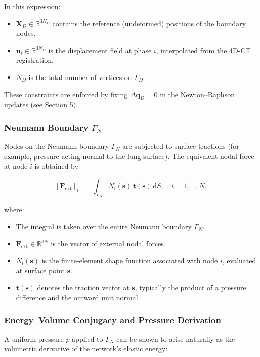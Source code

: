 \documentclass{article}
\begin{document}
In this expression:
\begin{itemize}
  \item $\mathbf X_D\in\mathbb R^{3N_D}$ contains the reference (undeformed) positions of the boundary nodes.
  \item $\mathbf u_i\in\mathbb R^{3N_D}$ is the displacement field at phase $i$, interpolated from the 4D-CT registration.
  \item $N_D$ is the total number of vertices on $\Gamma_D$.
\end{itemize}

These constraints are enforced by fixing $\Delta\mathbf q_D=0$ in the Newton–Raphson updates (see Section 5).

\subsubsection{Neumann Boundary $\Gamma_N$}

Nodes on the Neumann boundary $\Gamma_N$ are subjected to surface tractions (for example, pressure acting normal to the lung surface). 
The equivalent nodal force at node $i$ is obtained by

$$
  [\mathbf F_{\mathrm{ext}}]_i
  \;=\;
  \int_{\Gamma_N} N_i(\mathbf s)\,\mathbf t(\mathbf s)\,\mathrm dS,
  \quad i=1,\dots,N,
$$

where:
\begin{itemize}
  \item The integral is taken over the entire Neumann boundary $\Gamma_N$.
  \item $\mathbf F_{\mathrm{ext}}\in\mathbb R^{3N}$ is the vector of external nodal forces.
  \item $N_i(\mathbf s)$ is the finite-element shape function associated with node $i$, evaluated at surface point $\mathbf s$.
  \item $\mathbf t(\mathbf s)$ denotes the traction vector at $\mathbf s$, 
  typically the product of a pressure difference and the outward unit normal.
\end{itemize}


\subsubsection{Energy–Volume Conjugacy and Pressure Derivation}

A uniform pressure $p$ applied to $\Gamma_N$ can be shown to arise naturally as the volumetric derivative of the network’s elastic energy:
\end{document}
